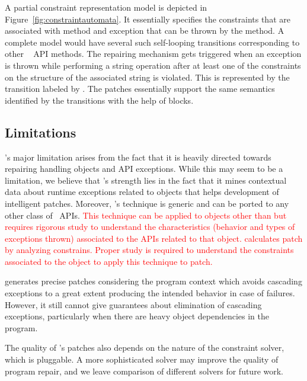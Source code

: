 A partial constraint representation model is depicted in
Figure~\ref{fig:constraintautomata}. It essentially specifies the constraints
that are associated with 
method and  exception that can be thrown by the
method. A complete model would
have several such self-looping transitions corresponding to other \java\
 API methods. The
repairing mechanism gets triggered when an exception is thrown while performing
a string operation after at least one of the constraints on the structure of
the associated string is violated. This is represented by the transition labeled
by \code{other}. The patches essentially support the same
semantics identified by the transitions with the help of  blocks.


\subsection{Limitations}
\label{sec:tool:limitation}

\tool's major limitation arises from the fact that it
is heavily directed towards repairing handling  objects and API
exceptions. While this may seem to be a limitation, we believe that \tool's
strength lies in the fact that it mines contextual data about runtime exceptions
related to \code{String} objects that helps development of intelligent patches.
Moreover, \tool's technique is generic and can be ported to any other class of
\java\ APIs. \textcolor{red}{This technique can be applied to objects other
than \code{String} but requires rigorous study to understand the
characteristics (behavior and types of exceptions thrown) associated to the APIs
related to that object.
\tool calculates patch by analyzing constrains. Proper study is required to understand the
constraints associated to the object to apply this technique to patch.}

\tool generates precise patches considering the program context which avoids
cascading exceptions to a great extent producing the intended behavior in case
of failures. However, it still cannot give guarantees about elimination of cascading
exceptions, particularly when there are heavy object dependencies in the program.

The quality of \tool's patches also depends on the nature of the constraint
solver, which is pluggable. A more sophisticated solver may improve the quality
of program repair, and we leave comparison of different solvers for future work.